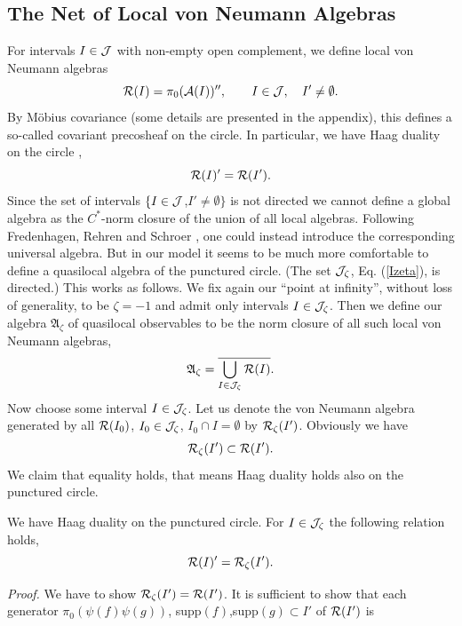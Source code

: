 \documentclass[10pt,a4paper]{article}
\begin{document}
\subsection{The Net of Local von Neumann Algebras}
For intervals $I\in {\cal J}$ with non-empty open
complement, we define local von Neumann algebras
\[ {\cal R}(I) = \pi_0({\cal A}(I))'', \qquad
I\in {\cal J},\quad I'\neq \emptyset. \]
By M{\"o}bius covariance (some details are
presented in the appendix), this
defines a so-called covariant precosheaf on the
circle. In particular, we have Haag duality on
the circle \cite{BGL,Buch},
\begin{equation}
\label{HD}
{\cal R}(I)'={\cal R}(I').
\end{equation}
Since the set of intervals
$\{I\in{\cal J}$,$I'\neq\emptyset\}$
is not directed we cannot define a
global algebra as the $C^*$-norm closure of the union
of all local algebras. Following Fredenhagen, Rehren and
Schroer \cite{FRS2}, one could instead introduce the
corresponding universal algebra. But in our model it
seems to be much more comfortable to define a
quasilocal algebra of the punctured circle. (The set
${\cal J}_\zeta$, Eq. (\ref{Izeta}), is directed.)
This works as follows.
We fix again our ``point at infinity'', without loss of
generality, to be $\zeta=-1$ and admit only intervals
$I\in{\cal J}_\zeta$. Then we define our algebra
$\mathfrak{A}_\zeta$ of quasilocal observables to be the
norm closure of all such local von Neumann
algebras,
\begin{equation}
\label{Azeta}
\mathfrak{A}_\zeta = \overline{\bigcup_{I\in{\cal J}_\zeta}
{\cal R}(I)}.
\end{equation}
Now choose some interval $I\in{\cal J}_\zeta$. Let us
denote the von Neumann algebra generated by all
${\cal R}(I_0)$, $I_0\in{\cal J}_\zeta$,
$I_0\cap I=\emptyset$ by ${\cal R}_\zeta(I')$.
Obviously we have
\[ {\cal R}_\zeta(I') \subset {\cal R}(I'). \]
We claim that equality holds, that means Haag duality
holds also on the punctured circle.
\begin{lemma}
We have Haag duality on the punctured circle.
For $I\in{\cal J}_\zeta$ the following relation holds,
\begin{equation}
\label{HDpunc}
{\cal R}(I)'={\cal R}_\zeta(I').
\end{equation}
\end{lemma}
{\it Proof.} We have to show
${\cal R}_\zeta(I')={\cal R}(I')$. It is sufficient to
show that each generator $\pi_0(\psi(f)\psi(g))$,
supp$(f)$,supp$(g)\subset I'$ of ${\cal R}(I')$ is
\end{document}
